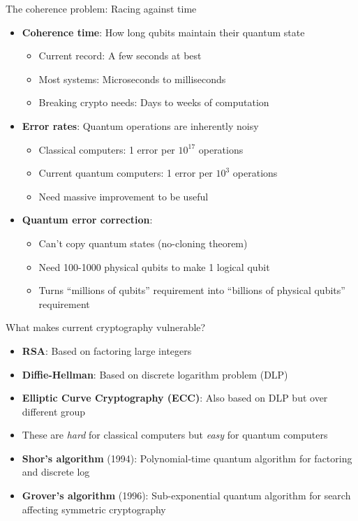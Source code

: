 \documentclass[aspectratio=169, lualatex]{beamer} %
\def\enrouge#1{\textcolor{rouge}{#1}}
\begin{document}
\begin{frame}{The coherence problem: Racing against time}
	\begin{itemize}
		\item \textbf{Coherence time}: How long qubits maintain their quantum state
		      \begin{itemize}
			      \item Current record: A few seconds at best
			      \item Most systems: Microseconds to milliseconds
			      \item Breaking crypto needs: Days to weeks of computation
		      \end{itemize}
		\item \textbf{Error rates}: Quantum operations are inherently noisy
		      \begin{itemize}
			      \item Classical computers: 1 error per $10^{17}$ operations
			      \item Current quantum computers: 1 error per $10^{3}$ operations
			      \item Need massive improvement to be useful
		      \end{itemize}
		\item \textbf{Quantum error correction}:
		      \begin{itemize}
			      \item Can't copy quantum states (no-cloning theorem)
			      \item Need 100-1000 physical qubits to make 1 logical qubit
			      \item \enrouge{Turns ``millions of qubits'' requirement into ``billions of physical qubits'' requirement}
		      \end{itemize}
	\end{itemize}
\end{frame}

\begin{frame}{What makes current cryptography vulnerable?}
	\begin{itemize}
		\item \textbf{RSA}: Based on factoring large integers
		\item \textbf{Diffie-Hellman}: Based on discrete logarithm problem (DLP)
		\item \textbf{Elliptic Curve Cryptography (ECC)}: Also based on DLP but over different group
		\item These are \textit{hard} for classical computers but \textit{easy} for quantum computers
		\item \textbf{Shor's algorithm} (1994): Polynomial-time quantum algorithm for factoring and discrete log
		\item \textbf{Grover's algorithm} (1996): Sub-exponential quantum algorithm for search affecting symmetric cryptography
	\end{itemize}
\end{frame}
\end{document}

